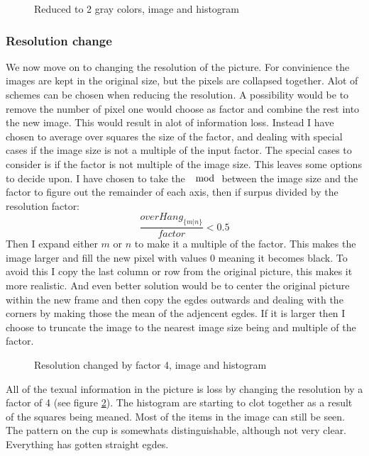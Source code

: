 \documentclass[a4paper, 10pt, final]{article}
\begin{document}
\begin{figure}[!h]
\centering
{}
\caption{Reduced to 2 gray colors, image and histogram}
\label{fig:reduceGray2}
\end{figure}

\subsubsection*{Resolution change}
We now move on to changing the resolution of the picture. For convinience the images are kept in the original size, but the pixels are collapsed together. Alot of schemes can be chosen when reducing the resolution. A possibility would be to remove the number of pixel one would choose as factor and combine the rest into the new image. This would result in alot of information loss. Instead I have chosen to average over squares the size of the factor, and dealing with special cases if the image size is not a multiple of the input factor. The special cases to consider is if the factor is not multiple of the image size. This leaves some options to decide upon. I have chosen to take the $\mod$ between the image size and the factor to figure out the remainder of each axis, then if surpus divided by the resolution factor:
\[
\frac{overHang_{\{m|n\}}}{factor} < 0.5
\]
Then I expand either $m$ or $n$ to make it a multiple of the factor. This makes the image larger and fill the new pixel with values $0$ meaning it becomes black. To avoid this I copy the last column or row from the original picture, this makes it more realistic. And even better solution would be to center the original picture within the new frame and then copy the egdes outwards and dealing with the corners by making those the mean of the adjencent egdes. If it is larger then I choose to truncate the image to the nearest image size being and multiple of the factor.

\begin{figure}[!h]
\centering
{}
\caption{Resolution changed by factor 4, image and histogram}
\label{fig:resolutionFactor4}
\end{figure}

All of the texual information in the picture is loss by changing the resolution by a factor of 4 (see figure \ref{fig:resolutionFactor4}). The histogram are starting to clot together as a result of the squares being meaned. Most of the items in the image can still be seen. The pattern on the cup is somewhats distinguishable, although not very clear. Everything has gotten straight egdes.
\end{document}
